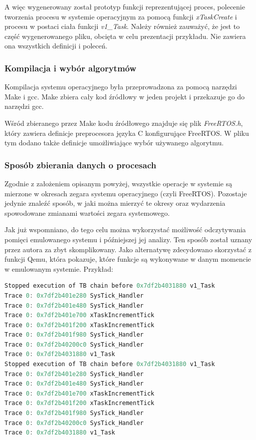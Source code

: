 \documentclass[../../main]{subfiles}
\begin{document}
A więc wygenerowany został prototyp funkcji reprezentującej proces, polecenie tworzenia procesu w systemie operacyjnym za pomocą funkcji \textit{xTaskCreate} i procesu w postaci ciała funkcji \textit{v1\_Task}. Należy również zauważyć, że jest to część wygenerowanego pliku, obcięta w celu prezentacji przykładu. Nie zawiera ona wszystkich definicji i poleceń.

\subsubsection{Kompilacja i wybór algorytmów}

Kompilacja systemu operacyjnego była przeprowadzona za pomocą narzędzi Make i \acrshort{gcc}. Make zbiera cały kod źródłowy w jeden projekt i przekazuje go do narzędzi \acrshort{gcc}.

Wśród zbieranego przez Make kodu źródłowego znajduje się plik \textit{FreeRTOS.h}, który zawiera definicje preprocesora języka C konfigurujące FreeRTOS. W pliku tym dodano także definicje umożliwiające wybór używanego algorytmu.

\subsubsection{Sposób zbierania danych o procesach}

Zgodnie z założeniem opisanym powyżej, wszystkie operacje w systemie są mierzone w okresach zegara systemu operacyjnego (czyli FreeRTOS). Pozostaje jedynie znaleźć sposób, w jaki można mierzyć te okresy oraz wydarzenia spowodowane zmianami wartości zegara systemowego.

Jak już wspomniano, do tego celu można wykorzystać możliwość odczytywania pomięci emulowanego systemu i późniejszej jej analizy. Ten sposób został uznany przez autora za zbyt skomplikowany. Jako alternatywę zdecydowano skorzystać z funkcji Qemu, która pokazuje, które funkcje są wykonywane w danym momencie w emulowanym systemie. Przykład:

\begin{lstlisting}[language=C, caption={Przykładowe logi z Qemu}, label={lst:qemu-example-logs}]
Stopped execution of TB chain before 0x7df2b4031880 v1_Task
Trace 0: 0x7df2b401e280 SysTick_Handler
Trace 0: 0x7df2b401e480 SysTick_Handler
Trace 0: 0x7df2b401e700 xTaskIncrementTick
Trace 0: 0x7df2b401f200 xTaskIncrementTick
Trace 0: 0x7df2b401f980 SysTick_Handler
Trace 0: 0x7df2b40200c0 SysTick_Handler
Trace 0: 0x7df2b4031880 v1_Task
Stopped execution of TB chain before 0x7df2b4031880 v1_Task
Trace 0: 0x7df2b401e280 SysTick_Handler
Trace 0: 0x7df2b401e480 SysTick_Handler
Trace 0: 0x7df2b401e700 xTaskIncrementTick
Trace 0: 0x7df2b401f200 xTaskIncrementTick
Trace 0: 0x7df2b401f980 SysTick_Handler
Trace 0: 0x7df2b40200c0 SysTick_Handler
Trace 0: 0x7df2b4031880 v1_Task
\end{lstlisting}
\end{document}
